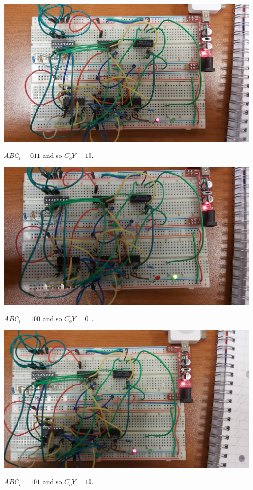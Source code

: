 \documentclass{article}
\begin{document}
\vspace{2em}

\includegraphics[width=\textwidth]{./figures/01101.jpg}
\begin{center}
	$ABC_i = 011$ and so $C_o Y= 10$.
\end{center}


\includegraphics[width=\textwidth]{./figures/10001.jpg}
\begin{center}
	$ABC_i = 100$ and so $C_o Y= 01$.
\end{center}

\vspace{2em}

\includegraphics[width=\textwidth]{./figures/10101.jpg}
\begin{center}
	$ABC_i = 101$ and so $C_o Y= 10$.
\end{center}
\end{document}
